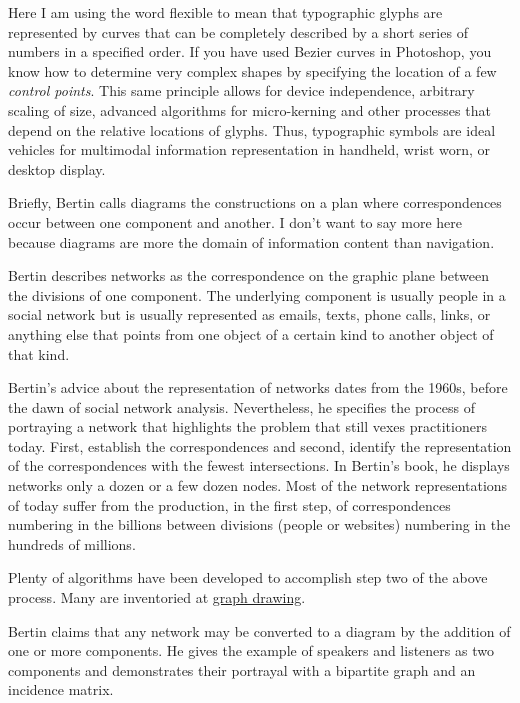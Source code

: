 Here I am using the word flexible to mean that typographic glyphs are
represented by curves that can be completely described by a short series
of numbers in a specified order. If you have used Bezier curves in
Photoshop, you know how to determine very complex shapes by specifying
the location of a few \emph{control points}. This same principle allows
for device independence, arbitrary scaling of size, advanced algorithms
for micro-kerning and other processes that depend on the relative
locations of glyphs. Thus, typographic symbols are ideal vehicles for
multimodal information representation in handheld, wrist worn, or
desktop display.

\hypertarget{diagrams}{%
\label{diagrams}}

Briefly, Bertin calls diagrams the constructions on a plan where
correspondences occur between one component and another. I don't want to
say more here because diagrams are more the domain of information
content than navigation.

\hypertarget{networks}{%
\label{networks}}

Bertin describes networks as the correspondence on the graphic plane
between the divisions of one component. The underlying component is
usually people in a social network but is usually represented as emails,
texts, phone calls, links, or anything else that points from one object
of a certain kind to another object of that kind.

Bertin's advice about the representation of networks dates from the
1960s, before the dawn of social network analysis. Nevertheless, he
specifies the process of portraying a network that highlights the
problem that still vexes practitioners today. First, establish the
correspondences and second, identify the representation of the
correspondences with the fewest intersections. In Bertin's book, he
displays networks only a dozen or a few dozen nodes. Most of the network
representations of today suffer from the production, in the first step,
of correspondences numbering in the billions between divisions (people
or websites) numbering in the hundreds of millions.

Plenty of algorithms have been developed to accomplish step two of the
above process. Many are inventoried at
\href{http://en.wikipedia.org/wiki/Graph_drawing}{graph drawing}.

Bertin claims that any network may be converted to a diagram by the
addition of one or more components. He gives the example of speakers and
listeners as two components and demonstrates their portrayal with a
bipartite graph and an incidence matrix.

